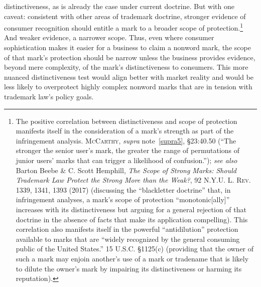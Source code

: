 \documentclass[letterpaper, 11pt, oneside]{article}
\begin{document}
distinctiveness, as is already the case under current doctrine. But with one caveat: consistent with other areas of trademark doctrine, stronger evidence of consumer recognition should entitle a mark to a broader scope of protection.\footnote{The positive correlation between distinctiveness and scope of protection manifests itself in the consideration of a mark's strength as part of the infringement analysis. \textsc{McCarthy}, \textit{supra} note~\ref{supra5}, \S 23:40.50 (``The stronger the senior user's mark, the greater the range of permutations of junior users' marks that can trigger a likelihood of confusion.''); \textit{see also} Barton Beebe \& C. Scott Hemphill, \textit{The Scope of Strong Marks: Should Trademark Law Protect the Strong More than the Weak?}, 92 \textsc{N.Y.U. L. Rev.} 1339, 1341, 1393 (2017) (discussing the ``blackletter doctrine'' that, in infringement analyses, a mark's scope of protection ``monotonic[ally]'' increases with its distinctiveness but arguing for a general rejection of that doctrine in the absence of facts that make its application compelling). This correlation also manifests itself in the powerful ``antidilution'' protection available to marks that are ``widely recognized by the general consuming public of the United States.'' 15 U.S.C. \S 1125(c) (providing that the owner of such a mark may enjoin another's use of a mark or tradename that is likely to dilute the owner's mark by impairing its distinctiveness or harming its reputation).} And weaker evidence, a narrower scope. Thus, even where consumer sophistication makes it easier for a business to claim a nonword mark, the scope of that mark's protection should be narrow unless the business provides evidence, beyond mere complexity, of the mark's distinctiveness to consumers. This more nuanced distinctiveness test would align better with market reality and would be less likely to overprotect highly complex nonword marks that are in tension with trademark law's policy goals.
\end{document}
